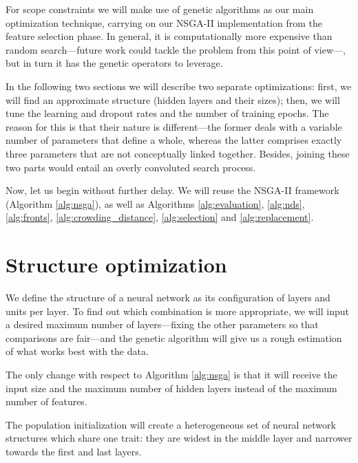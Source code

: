 For scope constraints we will make use of genetic algorithms as our main optimization technique, carrying on our \acs{NSGA-II} implementation from the feature selection phase. In general, it is computationally more expensive than random search---future work could tackle the problem from this point of view---, but in turn it has the genetic operators to leverage.

In the following two sections we will describe two separate optimizations: first, we will find an approximate structure (hidden layers and their sizes); then, we will tune the learning and dropout rates and the number of training epochs. The reason for this is that their nature is different---the former deals with a variable number of parameters that define a whole, whereas the latter comprises exactly three parameters that are not conceptually linked together. Besides, joining these two parts would entail an overly convoluted search process.

Now, let us begin without further delay. We will reuse the \acs{NSGA-II} framework (Algorithm \ref{alg:nsga}), as well as Algorithms \ref{alg:evaluation}, \ref{alg:nds}, \ref{alg:fronts}, \ref{alg:crowding_distance}, \ref{alg:selection} and \ref{alg:replacement}.

\section{Structure optimization}

	We define the structure of a neural network as its configuration of layers and units per layer. To find out which combination is more appropriate, we will input a desired maximum number of layers---fixing the other parameters so that comparisons are fair---and the genetic algorithm will give us a rough estimation of what works best with the data.

	The only change with respect to Algorithm \ref{alg:nsga} is that it will receive the input size and the maximum number of hidden layers instead of the maximum number of features.

	The population initialization will create a heterogeneous set of neural network structures which share one trait: they are widest in the middle layer and narrower towards the first and last layers.

	\vspace{0.2cm}

